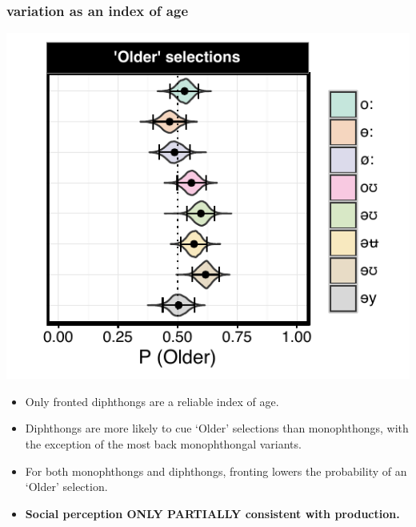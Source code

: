 \documentclass[a0,portrait]{a0poster}
\begin{document}
\begin{multicols*}{3}
\subsubsection*{ variation as an index of age}
\hspace*{-1cm}
\begin{minipage}{0.2\textwidth}
\includegraphics[scale=2.2]{ow_age_effects.pdf}
\end{minipage}
\hspace*{1.8cm}
\begin{minipage}{0.12\textwidth}
\raggedright
\begin{itemize}
\item{Only fronted diphthongs are a reliable index of age.}
\item{Diphthongs are more likely to cue `Older' selections than monophthongs, with the exception of the most back monophthongal variants.}
\item{For both monophthongs and diphthongs, fronting lowers the probability of an `Older' selection.}
\end{itemize}
\end{minipage}
\vspace*{0.5cm}
\begin{itemize}
\item{\textbf{Social perception ONLY PARTIALLY consistent with production.}}
\end{itemize}

\end{multicols*}
\end{document}
